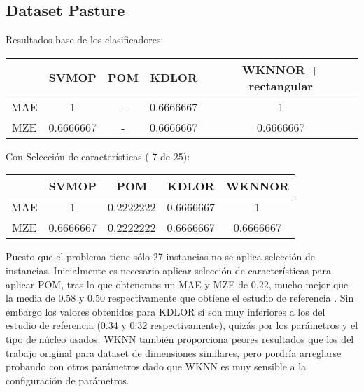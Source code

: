 \subsection{Dataset Pasture}
Resultados base de los clasificadores:
\begin{center}
\begin{tabular}{ c c c c c }
	& SVMOP & POM & KDLOR & WKNNOR + rectangular \\
	\hline	
	MAE &   1  & - & 0.6666667 &  1 \\
	MZE &	0.6666667 & - & 0.6666667 & 0.6666667  \\
	\hline  
\end{tabular}
\end{center}
\vspace{20pt}
Con Selección de características ( 7 de 25):
\begin{center}
\begin{tabular}{ c c c c c }
	& SVMOP & POM & KDLOR & WKNNOR \\
	\hline	
	MAE &   1  & 0.2222222 & 0.6666667 &  1 \\
	MZE &	0.6666667 & 0.2222222 & 0.6666667 & 0.6666667  \\
	\hline  
\end{tabular}
\end{center}

Puesto que el problema tiene sólo 27 instancias no se aplica selección de instancias. Inicialmente es necesario aplicar selección de características para aplicar POM, tras lo que obtenemos un MAE y MZE de 0.22, mucho mejor que la media de 0.58 y 0.50 respectivamente que obtiene el estudio de referencia \cite{Gutiérrez2016}. Sin embargo los valores obtenidos para KDLOR sí son muy inferiores a los del estudio de referencia (0.34 y 0.32 respectivamente), quizás por los parámetros y el tipo de núcleo usados. WKNN también proporciona peores resultados que los del trabajo original para dataset de dimensiones similares, pero pordría arreglarse probando con otros parámetros dado que WKNN es muy sensible a la configuración de parámetros.

